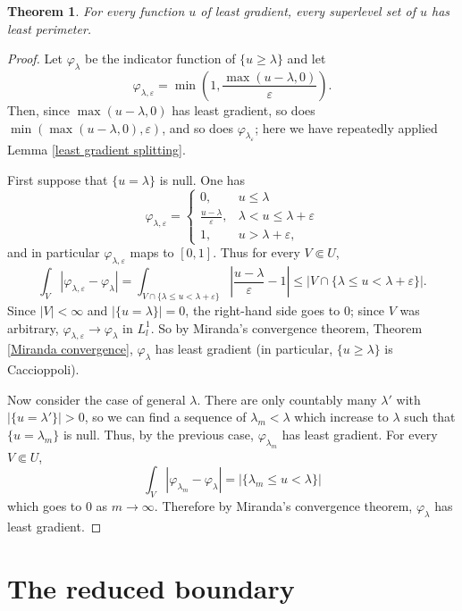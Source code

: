 \documentclass[reqno,12pt,letterpaper]{amsart}
\newtheorem{theorem}{Theorem}[section]
\theoremstyle{definition}
\numberwithin{equation}{section}
\begin{document}
\begin{theorem}
For every function $u$ of least gradient, every superlevel set of $u$ has least perimeter.
\end{theorem}
\begin{proof}
Let $\varphi_\lambda$ be the indicator function of $\{u \geq \lambda\}$ and let
$$\varphi_{\lambda,\varepsilon} = \min\left(1, \frac{\max(u - \lambda, 0)}{\varepsilon}\right).$$
Then, since $\max(u - \lambda, 0)$ has least gradient, so does $\min(\max(u - \lambda, 0), \varepsilon)$, and so does $\varphi_{\lambda_\varepsilon}$; here we have repeatedly applied Lemma \ref{least gradient splitting}.

First suppose that $\{u = \lambda\}$ is null. One has
$$\varphi_{\lambda,\varepsilon} = \begin{cases}
0, &u \leq \lambda\\
\frac{u - \lambda}{\varepsilon}, &\lambda < u \leq \lambda + \varepsilon\\
1, & u > \lambda + \varepsilon,
\end{cases}$$
and in particular $\varphi_{\lambda,\varepsilon}$ maps to $[0, 1]$. Thus for every $V \Subset U$,
$$\int_V |\varphi_{\lambda,\varepsilon} - \varphi_\lambda| = \int_{V \cap \{\lambda \leq u < \lambda + \varepsilon\}} \left|\frac{u - \lambda}{\varepsilon} - 1\right| \leq |V \cap \{\lambda \leq u < \lambda + \varepsilon\}|.$$
Since $|V| < \infty$ and $|\{u = \lambda\}| = 0$, the right-hand side goes to $0$; since $V$ was arbitrary, $\varphi_{\lambda,\varepsilon} \to \varphi_\lambda$ in $L^1_l$.
So by Miranda's convergence theorem, Theorem \ref{Miranda convergence}, $\varphi_\lambda$ has least gradient (in particular, $\{u \geq \lambda\}$ is Caccioppoli).

Now consider the case of general $\lambda$.
There are only countably many $\lambda'$ with $|\{u = \lambda'\}| > 0$, so we can find a sequence of $\lambda_m < \lambda$ which increase to $\lambda$ such that $\{u = \lambda_m\}$ is null.
Thus, by the previous case, $\varphi_{\lambda_m}$ has least gradient.
For every $V \Subset U$,
$$\int_V |\varphi_{\lambda_m} - \varphi_\lambda| = |\{\lambda_m \leq u < \lambda\}|$$
which goes to $0$ as $m \to \infty$. Therefore by Miranda's convergence theorem, $\varphi_\lambda$ has least gradient.
\end{proof}

\section{The reduced boundary}
\end{document}
